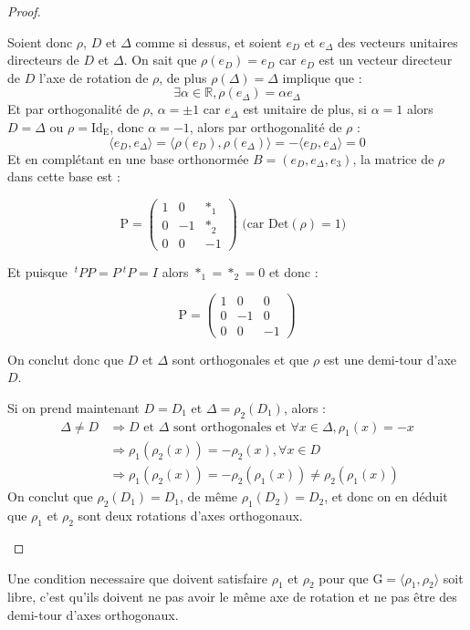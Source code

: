 \begin{proof}
\begin{itemize}
 Soient donc $\rho$, $D$ et $\Delta$ comme si dessus, et soient $e_D$ et $e_\Delta$ des vecteurs unitaires directeurs de $D$ et $\Delta$.
 On sait que $\rho(e_D)=e_D$ car $e_D$ est un vecteur directeur de $D$ l'axe de rotation de $\rho$, de plus $\rho(\Delta)=\Delta$ implique que :
 $$\exists \alpha \in \mathbb{R}, \rho(e_\Delta)=\alpha e_\Delta$$
 Et par orthogonalité de $\rho$, $\alpha=\pm 1$ car $e_\Delta$ est unitaire de plus, si $\alpha=1$ alors $D=\Delta$ ou $\rho=\mathrm{Id_E}$,
 donc $\alpha = -1$, alors par orthogonalité de $\rho$ : $$\langle e_D,e_\Delta  \rangle=\langle \rho(e_D),\rho(e_\Delta) \rangle=-\langle e_D,e_\Delta  \rangle = 0$$
 Et en complétant en une base orthonormée $B=(e_D,e_\Delta,e_3)$, la matrice de $\rho$ dans cette base est :
 \begin{center}
 \[
 \mathrm{P}=
 \begin{pmatrix}
 1 & 0 & *_1\\
 0 & -1 & *_2 \\
 0 & 0 & -1
 \end{pmatrix}
 \text{ (car $\mathrm{Det}(\rho)=1)$ }
 \]
 \end{center}
 Et puisque $~^tPP=P~^tP=I$ alors $*_1=*_2=0$ et donc :
 \begin{center}
 \[
 \mathrm{P}=
 \begin{pmatrix}
 1 & 0 & 0\\
 0 & -1 & 0 \\
 0 & 0 & -1
 \end{pmatrix}
 \]
 \end{center}
 On conclut donc que $D$ et $\Delta$ sont orthogonales et que $\rho$ est une demi-tour d'axe $D$.\par
 Si on prend maintenant $D = D_1$ et $\Delta = \rho_2(D_1)$, alors :
 \begin{align*}
   \Delta \neq D &\Rightarrow \text{$D$ et $\Delta$ sont orthogonales et $\forall x \in \Delta, \rho_1(x) = -x$}\\
   &\Rightarrow \rho_1(\rho_2(x))=-\rho_2(x), \forall x \in D\\
   &\Rightarrow \rho_1(\rho_2(x))=-\rho_2(\rho_1(x)) \neq \rho_2(\rho_1(x))
 \end{align*}
 On conclut que $\rho_2(D_1)=D_1$, de même $\rho_1(D_2)=D_2$, et donc on en déduit que $\rho_1$ et $\rho_2$ sont deux rotations d'axes orthogonaux.\par
\end{itemize}
\end{proof}
\begin{Cor}
  Une condition necessaire que doivent satisfaire $\rho_1$ et $\rho_2$ pour que $\mathrm{G} = \langle\rho_1, \rho_2 \rangle$ soit libre, c'est qu'ils doivent ne pas avoir le même axe de rotation et ne pas être des demi-tour d'axes orthogonaux.
\end{Cor}
